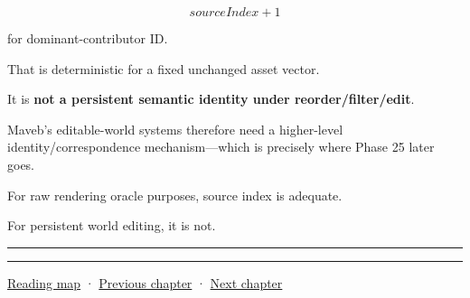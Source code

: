 \[
sourceIndex+1
\]

for dominant-contributor ID.

That is deterministic for a fixed unchanged asset vector.

It is \textbf{not a persistent semantic identity under reorder/filter/edit}.

Maveb's editable-world systems therefore need a higher-level identity/correspondence mechanism---which is precisely where Phase 25 later goes.

For raw rendering oracle purposes, source index is adequate.

For persistent world editing, it is not.

\begin{center}\rule{0.5\linewidth}{0.5pt}\end{center}

\begin{center}\rule{0.5\linewidth}{0.5pt}\end{center}

\hyperref[volume-reading-map]{Reading map} · \hyperref[04-visual-computing-ii-ch036-source-atlas-and-reconstruction-checkpoints]{Previous chapter} · \hyperref[04-visual-computing-ii-ch038-projecting-ellipsoids-into-screen-space-conics]{Next chapter}

